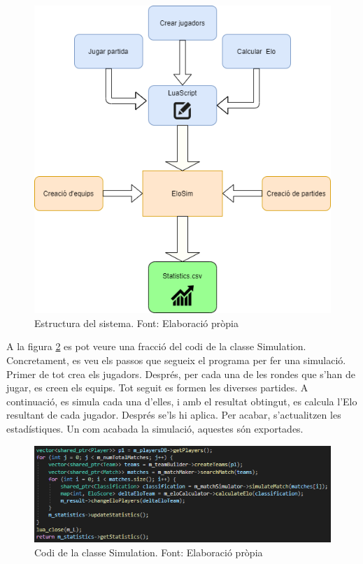 \documentclass[a4paper]{article}
\begin{document}
\begin{figure}[H]
    \centering
    \includegraphics[width=.9\textwidth]{images/TFG-Structure.png}
    \caption{Estructura del sistema. Font: Elaboració pròpia}
    \label{fig:EloSImEstructure}
\end{figure}

\newpage

A la figura \ref{fig:SimulationCo} es pot veure una fracció del codi de la classe Simulation. Concretament, es veu els passos que segueix el programa per fer una simulació. Primer de tot crea els jugadors. Després, per cada una de les rondes que s'han de jugar, es creen els equips. Tot seguit es formen les diverses partides. A continuació, es simula cada una d'elles, i amb el resultat obtingut, es calcula l'Elo resultant de cada jugador. Després se'ls hi aplica. Per acabar, s'actualitzen les estadístiques. Un com acabada la simulació, aquestes són exportades.

\begin{figure}[H]
    \centering
    \includegraphics[width=1\textwidth]{images/SimulationCode.png}
    \caption{Codi de la classe Simulation. Font: Elaboració pròpia}
    \label{fig:SimulationCo}
\end{figure}
\end{document}
